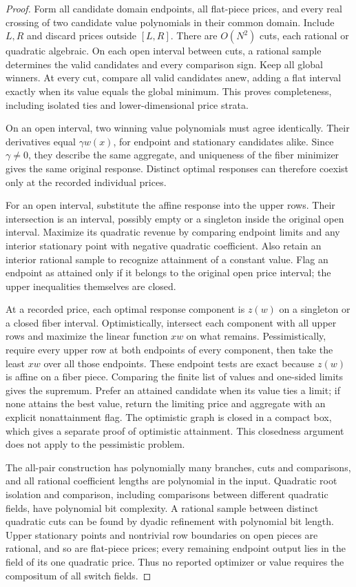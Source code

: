 \begin{proof}
Form all candidate domain endpoints, all flat-piece prices, and every real
crossing of two candidate value polynomials in their common domain. Include
$L,R$ and discard prices outside $[L,R]$. There are $O(N^2)$ cuts, each rational
or quadratic algebraic. On each open interval between cuts, a rational sample
determines the valid candidates and every comparison sign. Keep all global
winners. At every cut, compare all valid candidates anew, adding a flat interval
exactly when its value equals the global minimum. This proves completeness,
including isolated ties and lower-dimensional price strata.

On an open interval, two winning value polynomials must agree identically.
Their derivatives equal $\gamma w(x)$, for endpoint and stationary
candidates alike. Since $\gamma\ne0$, they describe the same aggregate, and
uniqueness of the fiber minimizer gives the same original response. Distinct
optimal responses can therefore coexist only at the recorded individual prices.

For an open interval, substitute the affine response into the upper rows.
Their intersection is an interval, possibly empty or a singleton inside the
original open interval. Maximize its quadratic revenue by comparing endpoint
limits and any interior stationary point with negative quadratic coefficient.
Also retain an interior rational sample to recognize attainment of a constant
value. Flag an endpoint as attained only if it belongs to the original open
price interval; the upper inequalities themselves are closed.

At a recorded price, each optimal response component is $z(w)$ on a singleton
or a closed fiber interval. Optimistically, intersect each component with all
upper rows and maximize the linear function $xw$ on what remains.
Pessimistically, require every upper row at both endpoints of every component,
then take the least $xw$ over all those endpoints. These endpoint tests are
exact because $z(w)$ is affine on a fiber piece. Comparing the finite list of
values and one-sided limits gives the supremum. Prefer an attained candidate
when its value ties a limit; if none attains the best value, return the limiting
price and aggregate with an explicit nonattainment flag. The optimistic graph
is closed in a compact box, which gives a separate proof of optimistic
attainment. This closedness argument does not apply to the pessimistic problem.

The all-pair construction has polynomially many branches, cuts and comparisons,
and all rational coefficient lengths are polynomial in the input. Quadratic
root isolation and comparison, including comparisons between different
quadratic fields, have polynomial bit complexity. A rational sample between
distinct quadratic cuts can be found by dyadic refinement with polynomial bit
length. Upper stationary points and nontrivial row boundaries on open pieces
are rational, and so are flat-piece prices; every remaining endpoint output
lies in the field of its one quadratic price. Thus no reported optimizer or
value requires the compositum of all switch fields.
\end{proof}

